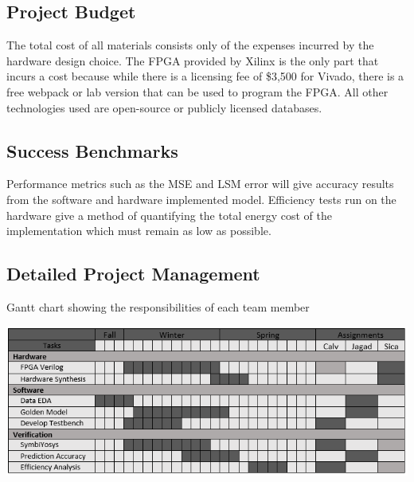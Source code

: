 \documentclass[12pt,titlepage]{article}
\begin{document}
\subsection{Project Budget}
The total cost of all materials consists only of the expenses incurred by the hardware design choice. The FPGA provided by Xilinx is the only part that
incurs a cost because while there is a licensing fee of \$3,500 for Vivado, there is a free webpack or lab version that can be used to program the FPGA.
All other technologies used are open-source or publicly licensed databases.

\subsection{Success Benchmarks}
Performance metrics such as the MSE and LSM error will give accuracy results from the software and hardware implemented model. Efficiency tests run on the
hardware give a method of quantifying the total energy cost of the implementation which must remain as low as possible. 




\newpage
\begin{appendices}
\section{Detailed Project Management}
\begin{table}[!htb]
	\caption{Gantt chart showing the responsibilities of each team member}
	\label{tbl:gantt}
	\includegraphics[width=\linewidth]{gantt.png}
\end{table}
\end{appendices}
\end{document}
